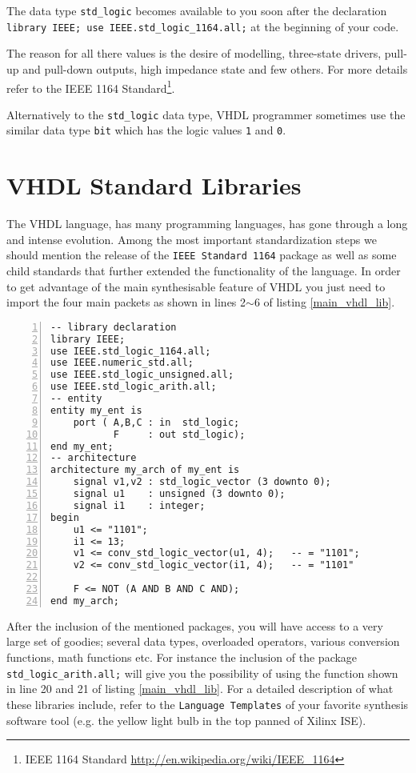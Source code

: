 The data type \texttt{std\_logic} becomes available to you soon after the declaration \texttt{library IEEE; use IEEE.std\_logic\_1164.all;} at the beginning of your code.

The reason for all there values is the desire of modelling, three-state drivers, pull-up and pull-down outputs, high impedance state and few others. For more details refer to the IEEE 1164 Standard\footnote{IEEE 1164 Standard \url{http://en.wikipedia.org/wiki/IEEE_1164}}.

Alternatively to the \texttt{std\_logic} data type, VHDL programmer sometimes use the similar data type \texttt{bit} which has the logic values \texttt{1} and \texttt{0}.

\section{VHDL Standard Libraries}
The VHDL language, has many programming languages, has gone through a long and intense evolution. Among the most important standardization steps we should mention the release of the \texttt{IEEE Standard 1164} package as well as some child standards that further extended the functionality of the language. In order to get advantage of the main synthesisable feature of VHDL you just need to import the four main packets as shown in lines 2$\sim$6 of listing \ref{main_vhdl_lib}.

\begin{minipage}{0.98\linewidth}
\begin{lstlisting}[numbers=left,label=main_vhdl_lib, caption=Typical inclusions of IEEE standard libraries.]
-- library declaration
library IEEE;
use IEEE.std_logic_1164.all;
use IEEE.numeric_std.all;
use IEEE.std_logic_unsigned.all;
use IEEE.std_logic_arith.all;
-- entity
entity my_ent is
	port ( A,B,C : in  std_logic;
	       F     : out std_logic);
end my_ent;
-- architecture
architecture my_arch of my_ent is
    signal v1,v2 : std_logic_vector (3 downto 0);
    signal u1    : unsigned (3 downto 0);
    signal i1    : integer;
begin
    u1 <= "1101";
    i1 <= 13;
    v1 <= conv_std_logic_vector(u1, 4);   -- = "1101";
    v2 <= conv_std_logic_vector(i1, 4);   -- = "1101"

	F <= NOT (A AND B AND C AND);	
end my_arch;
\end{lstlisting}
\end{minipage}

After the inclusion of the mentioned packages, you will have access to a very large set of goodies; several data types, overloaded operators, various conversion functions, math functions etc. For instance the inclusion of the package \texttt{std\_logic\_arith.all;} will give you the possibility of using the function shown in line 20 and 21 of listing \ref{main_vhdl_lib}. For a detailed description of what these libraries include, refer to the \texttt{Language Templates} of your favorite synthesis software tool (e.g. the yellow light bulb in the top panned of Xilinx ISE).

